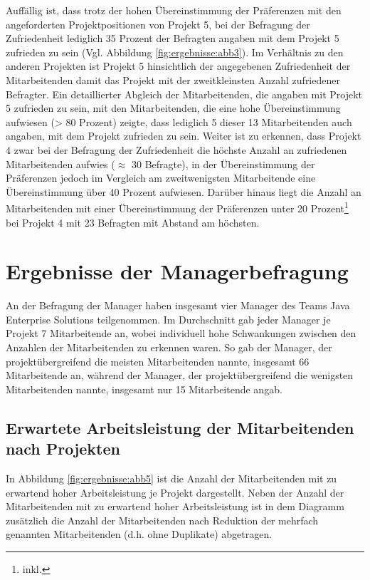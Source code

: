 Auffällig ist, dass trotz der hohen Übereinstimmung der Präferenzen mit den angeforderten Projektpositionen von Projekt 5, bei der Befragung der Zufriedenheit lediglich 35 Prozent der Befragten angaben mit dem Projekt 5 zufrieden zu sein (Vgl. Abbildung \ref{fig:ergebnisse:abb3}).
Im Verhältnis zu den anderen Projekten ist Projekt 5 hinsichtlich der angegebenen Zufriedenheit der Mitarbeitenden damit das Projekt mit der zweitkleinsten Anzahl zufriedener Befragter.
Ein detaillierter Abgleich der Mitarbeitenden, die angaben mit Projekt 5 zufrieden zu sein, mit den Mitarbeitenden, die eine hohe Übereinstimmung aufwiesen (> 80 Prozent) zeigte, dass lediglich 5 dieser 13 Mitarbeitenden auch angaben, mit dem Projekt zufrieden zu sein.
Weiter ist zu erkennen, dass Projekt 4 zwar bei der Befragung der Zufriedenheit die höchste Anzahl an zufriedenen Mitarbeitenden aufwies ($\approx$ 30 Befragte), in der Übereinstimmung der Präferenzen jedoch im Vergleich am zweitwenigsten Mitarbeitende eine Übereinstimmung über 40 Prozent aufwiesen.
Darüber hinaus liegt die Anzahl an Mitarbeitenden mit einer Übereinstimmung der Präferenzen unter 20 Prozent\footnote{inkl.} bei Projekt 4 mit 23 Befragten mit Abstand am höchsten.

\section{Ergebnisse der Managerbefragung}
An der Befragung der Manager haben insgesamt vier Manager des Teams Java Enterprise Solutions teilgenommen.
Im Durchschnitt gab jeder Manager je Projekt 7 Mitarbeitende an, wobei individuell hohe Schwankungen zwischen den Anzahlen der Mitarbeitenden zu erkennen waren.
So gab der Manager, der projektübergreifend die meisten Mitarbeitenden nannte, insgesamt 66 Mitarbeitende an, während der Manager, der projektübergreifend die wenigsten Mitarbeitenden nannte, insgesamt nur 15 Mitarbeitende angab.

\subsection{Erwartete Arbeitsleistung der Mitarbeitenden nach Projekten}
In Abbildung \ref{fig:ergebnisse:abb5} ist die Anzahl der Mitarbeitenden mit zu erwartend hoher Arbeitsleistung je Projekt dargestellt.
Neben der Anzahl der Mitarbeitenden mit zu erwartend hoher Arbeitsleistung ist in dem Diagramm zusätzlich die Anzahl der Mitarbeitenden nach Reduktion der mehrfach genannten Mitarbeitenden (d.h. ohne Duplikate) abgetragen.

